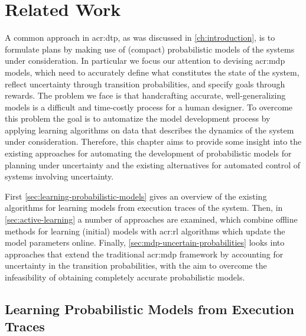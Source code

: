 \chapter{Related Work}
\label{ch:problem-related-work}

A common approach in \acrshort{acr:dtp}, as was discussed in \autoref{ch:introduction}, is to formulate plans by making use of (compact) probabilistic models of the systems under consideration.
In particular we focus our attention to devising \acrshort{acr:mdp} models, which need to accurately define what constitutes the state of the system, reflect uncertainty through transition probabilities, and specify goals through rewards.
The problem we face is that handcrafting accurate, well-generalizing models is a difficult and time-costly process for a human designer.
To overcome this problem the goal is to automatize the model development process by applying learning algorithms on data that describes the dynamics of the system under consideration.
Therefore, this chapter aims to provide some insight into the existing approaches for automating the development of probabilistic models for planning under uncertainty and the existing alternatives for automated control of systems involving uncertainty.

First \autoref{sec:learning-probabilistic-models} gives an overview of the existing algorithms for learning models from execution traces of the system.
Then, in \autoref{sec:active-learning} a number of approaches are examined, which combine offline methods for learning (initial) models with \acrshort{acr:rl} algorithms which update the model parameters online.
Finally, \autoref{sec:mdp-uncertain-probabilities} looks into approaches that extend the traditional \acrshort{acr:mdp} framework by accounting for uncertainty in the transition probabilities, with the aim to overcome the infeasibility of obtaining completely accurate probabilistic models.

%

\section{Learning Probabilistic Models from Execution Traces}
\label{sec:learning-probabilistic-models}

